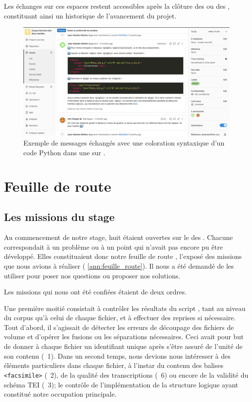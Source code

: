 Les échanges sur ces espaces restent accessibles après la clôture des \issues{} ou des \mergerequests{}, constituant ainsi un historique de l'avancement du projet.

\begin{figure}
    \centering
    \includegraphics[width=16cm]{img/gitlab.png}
    \caption[Messages dans une \issue{} \gitlab]{Exemple de messages échangés avec une coloration syntaxique d'un code Python dans une \issue{} sur \gitlab.}
    \label{fig:ex_gitlab}
\end{figure}

\section{Feuille de route}

\subsection{Les missions du stage}

Au commencement de notre stage, huit \issues{} étaient ouvertes sur le \gitlab{} des \odm{}. Chacune correspondait à un problème ou à un point qui n'avait pas encore pu être développé. Elles constituaient donc notre \og feuille de route \fg, \cad{} l'exposé des missions que nous avions à réaliser (\ann{} \ref{ann:feuille_route}). Il nous a été demandé de les utiliser pour poser nos questions ou proposer nos solutions.

Les missions qui nous ont été confiées étaient de deux ordres.

Une première moitié consistait à contrôler les résultats du script \lse, tant au niveau du corpus qu'à celui de chaque fichier, et à effectuer des reprises si nécessaire. Tout d'abord, il s'agissait de détecter les erreurs de découpage des fichiers de volume et d'opérer les fusions ou les séparations nécessaires. Ceci avait pour but de donner à chaque fichier un identifiant unique après s'être assuré de l'unité de son contenu (\issue{}~1). Dans un second temps, nous devions nous intéresser à des éléments particuliers dans chaque fichier, à l'instar du contenu des balises \texttt{<facsimile>} (\issue{}~2), de la qualité des transcriptions (\issue{}~6) ou encore de la validité du schéma TEI (\issue{}~3); le contrôle de l'implémentation de la structure logique ayant constitué notre occupation principale.

